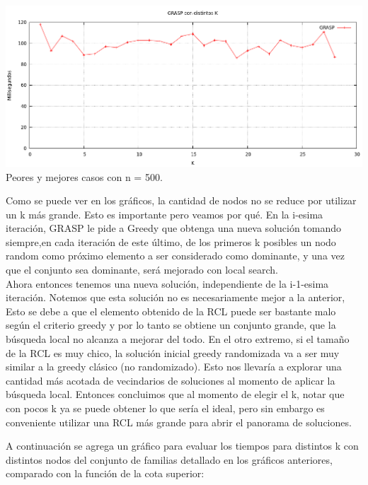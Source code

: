 \begin{center}
\includegraphics[width=15cm]{./graficos/GRASP_distintosK.png}\\
Peores y mejores casos con n = 500.
\end{center}


Como se puede ver en los gráficos, la cantidad de nodos no se reduce por utilizar un k más grande. Esto es importante pero veamos por qué.
En la i-esima iteración, GRASP le pide a Greedy que obtenga una nueva solución tomando siempre,en cada iteración de este último, de los primeros k posibles un nodo random como 
próximo elemento a ser considerado como dominante, y una vez que el conjunto sea dominante, será mejorado con local search.\\
Ahora entonces tenemos una nueva solución, independiente de la i-1-esima iteración. Notemos que esta solución no es necesariamente mejor a la anterior, 
Esto se debe a que el elemento obtenido de la RCL puede ser bastante malo según el criterio greedy y por lo
tanto se obtiene un conjunto grande, que la búsqueda local no alcanza a mejorar del todo. En el otro extremo, si el tamaño de la
RCL es muy chico, la solución inicial greedy randomizada va a ser muy similar a la greedy clásico (no randomizado). Esto nos
llevaría a explorar una cantidad más acotada de vecindarios de soluciones al momento de aplicar la búsqueda local.
Entonces concluimos que al momento de elegir el k, notar que con pocos k ya se puede obtener lo que sería el ideal, pero sin embargo es conveniente utilizar una RCL
más grande para abrir el panorama de soluciones.

A continuación se agrega un gráfico para evaluar los tiempos para distintos k con distintos nodos del conjunto de familias detallado en los gráficos anteriores, comparado con la función de la cota superior:


